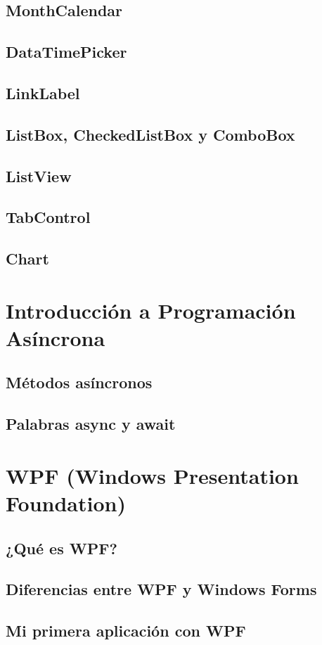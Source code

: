 \documentclass[12pt,a4paper]{report}
\begin{document}
\section{MonthCalendar}
\section{DataTimePicker}
\section{LinkLabel}
\section{ListBox, CheckedListBox y ComboBox}
\section{ListView}
\section{TabControl}
\section{Chart}

\chapter{Introducción a Programación Asíncrona}
\section{Métodos asíncronos}
\section{Palabras async y await}

\chapter{WPF (Windows Presentation Foundation)}
\section{¿Qué es WPF?}
\section{Diferencias entre WPF y Windows Forms}
\section{Mi primera aplicación con WPF}
\end{document}
